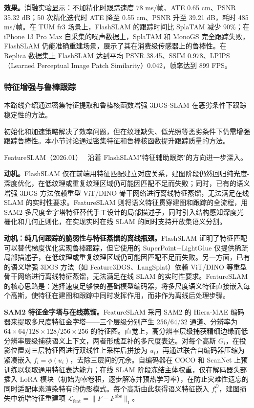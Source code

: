 \textbf{效果。}消融实验显示：不加精化时跟踪速度 78 ms/帧、ATE 0.65 cm、PSNR 35.32 dB；50 次精化迭代时 ATE 降至 0.55 cm、PSNR 升至 39.21 dB，耗时 485 ms/帧。在 TUM fr3 场景上，FlashSLAM 的跟踪时间比 SplaTAM 减少 90\%；在 iPhone 13 Pro Max 自采集的噪声数据上，SplaTAM 和 MonoGS 完全跟踪失败，FlashSLAM 仍能准确重建场景，展示了其在消费级传感器上的鲁棒性。在 Replica 数据集上 FlashSLAM 达到平均 PSNR 38.45、SSIM 0.978、LPIPS（Learned Perceptual Image Patch Similarity）0.042，帧率达到 899 FPS。

\subsubsection{特征增强与鲁棒跟踪}

本路线介绍通过密集特征提取和鲁棒核函数增强 3DGS-SLAM 在恶劣条件下跟踪稳定性的方法。

初始化和加速策略解决了效率问题，但在纹理缺失、低光照等恶劣条件下仍需增强跟踪鲁棒性。本小节讨论通过密集特征和鲁棒核函数提升跟踪质量的方法。

FeatureSLAM（2026.01）~\cite{2601_05738} 沿着 FlashSLAM"特征辅助跟踪"的方向进一步深入。

\textbf{动机。}FlashSLAM 仅在前端用特征匹配建立对应关系，建图阶段仍然回归纯光度-深度优化，在低纹理或重复纹理区域仍可能因匹配不足而失败；同时，已有的语义增强 3DGS 方法依赖重型 ViT/DINO 骨干网络进行离线特征蒸馏，无法满足在线 SLAM 的实时性要求。FeatureSLAM 则将语义特征贯穿建图和跟踪的全流程，用 SAM2 多尺度金字塔特征替代手工设计的局部描述子，同时引入结构感知深度光栅化和几何正则化，在实现实时在线 SLAM 的同时支持开放集语义分割。

\textbf{动机：纯几何跟踪的脆弱性与特征蒸馏的离线瓶颈。}FlashSLAM 证明了特征匹配可以替代梯度优化实现鲁棒跟踪，但它使用的 SuperPoint+LightGlue 仅提供稀疏局部描述子，在低纹理或重复纹理区域仍可能因匹配不足而失败。另一方面，已有的语义增强 3DGS 方法（如 Feature3DGS、LangSplat）依赖 ViT/DINO 等重型骨干网络进行离线特征蒸馏，无法满足在线 SLAM 的实时性要求。FeatureSLAM 的核心思路是：选择速度足够快的基础模型编码器，将多尺度语义特征直接嵌入每个高斯，使特征在建图和跟踪中同时发挥作用，而非作为离线后处理步骤。

\textbf{SAM2 特征金字塔与在线蒸馏。}FeatureSLAM 采用 SAM2 的 Hiera-MAE 编码器来提取多尺度特征金字塔——三个层级分别产生 256/64/32 通道、分辨率为 $64{\times}64$/$128{\times}128$/$256{\times}256$ 的特征图。直觉上，高分辨率层级捕获精细边缘而低分辨率层级捕获语义上下文，两者形成互补的多尺度表达。对每个高斯 $G_i$，在投影位置对三层特征图进行双线性上采样后拼接为 $u_i$，再通过联合自编码器压缩为紧凑嵌入 $f_i = \phi(u_i)$，去除三层间的冗余。自编码器在 COCO 和 ScanNet 上预训练以获取通用特征表达能力；在线 SLAM 阶段冻结主体权重，仅在解码器头部插入 LoRA 模块（初始为零卷积，逐步解冻并预热学习率），在防止灾难性遗忘的同时适配体素渲染特有的伪影模式。每个高斯由此获得语义特征嵌入 $f_i^D$，建图损失中新增特征重建项 $\mathcal{L}_\text{feat} = \|F - F^\text{obs}\|_1$。

